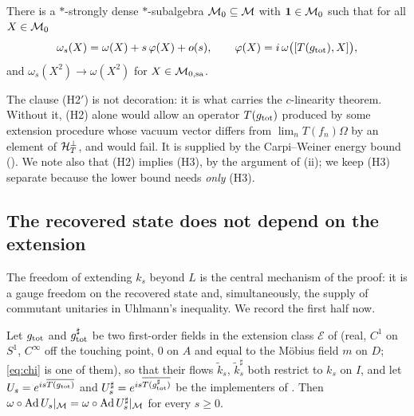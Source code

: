 \begin{hypothesis}\label{H3}
There is a $*$-strongly dense $*$-subalgebra $\mathcal M_{0}\subseteq\mathcal M$ with $\mathbf 1\in\mathcal M_{0}$ such that for all
$X\in\mathcal M_{0}$
\begin{equation}\label{eq:H3}
 \omega_{s}(X)=\omega(X)+s\,\varphi(X)+o(s),\qquad
 \varphi(X)=i\,\omega\bigl([T(g_{\rm tot}),X]\bigr),
\end{equation}
and $\omega_{s}(X^{2})\to\omega(X^{2})$ for $X\in\mathcal M_{0,\rm sa}$.
\end{hypothesis}

The clause (H2$'$) is not decoration: it is what carries the $c$-linearity theorem.  Without it, (H2) alone
would allow an operator $T(g_{\rm tot})$ produced by some extension procedure whose vacuum vector differs
from $\lim_{n}T(f_{n})\Omega$ by an element of $\mathcal H_T^{\perp}$, and  would fail.  It is
supplied by the Carpi--Weiner energy bound ().  We note also that (H2) implies (H3), by the
argument of (ii); we keep (H3) separate because the lower bound needs \emph{only} (H3).

\subsection{The recovered state does not depend on the extension}\label{ss:extindep}

The freedom of extending $k_s$ beyond $L$ is the central mechanism of the proof: it is a gauge freedom on
the recovered state and, simultaneously, the supply of commutant unitaries in Uhlmann's inequality.  We
record the first half now.

\begin{lemma}\label{lem:ext}
Let $g_{\rm tot}$ and $g_{\rm tot}^{\sharp}$ be two first-order fields in the extension class $\mathcal E$ of
\cite[Def.~2.1]{RigorC} (real, $C^{1}$ on $S^{1}$, $C^{\infty}$ off the touching point, $0$ on $A$ and equal to
the M\"obius field $m$ on $D$; \eqref{eq:chi} is one of them), so that their flows $\tilde k_{s}$,
$\tilde k_{s}^{\sharp}$ both restrict to $k_{s}$ on $I$, and let $U_{s}=e^{is\overline{T(g_{\rm tot})}}$ and
$U_{s}^{\sharp}=e^{is\overline{T(g^{\sharp}_{\rm tot})}}$ be the implementers of .  Then
$\omega\circ\operatorname{Ad} U_{s}|_{\mathcal M}=\omega\circ\operatorname{Ad} U_{s}^{\sharp}|_{\mathcal M}$ for every $s\ge0$.
\end{lemma}

